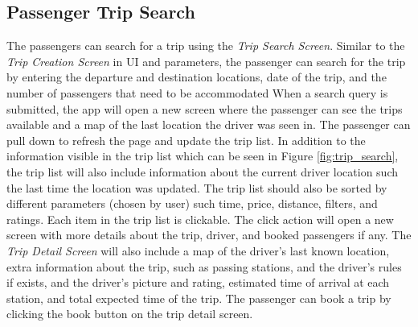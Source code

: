 \documentclass[a4paper, 12pt]{report} %
\begin{document}
        \pagebreak
        \subsection{Passenger Trip Search}
            The passengers can search for a trip using the \textit{Trip Search Screen}. Similar to the \textit{Trip Creation Screen} in UI and parameters, the passenger can search for the trip by entering the departure and destination locations, date of the trip, and the number of passengers that need to be accommodated When a search query is submitted, the app will open a new screen where the passenger can see the trips available and a map of the last location the driver was seen in. The passenger can pull down to refresh the page and update the trip list. In addition to the information visible in the trip list which can be seen in Figure \ref{fig:trip_search}, the trip list will also include information about the current driver location such the last time the location was updated. The trip list should also be sorted by different parameters (chosen by user) such time, price, distance, filters, and ratings. Each item in the trip list is clickable. The click action will open a new screen with more details about the trip, driver, and booked passengers if any. The \textit{Trip Detail Screen} will also include a map of the driver's last known location, extra information about the trip, such as passing stations, and the driver's rules if exists, and the driver's picture and rating, estimated time of arrival at each station, and total expected time of the trip. The passenger can book a trip by clicking the book button on the trip detail screen.
\end{document}
